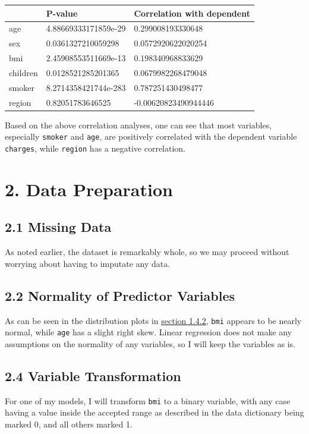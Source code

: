 \documentclass[]{article}
\begin{document}
\begin{longtable}[]{@{}lll@{}}
\toprule
& P-value & Correlation with dependent\tabularnewline
\midrule
\endhead
age & 4.88669333171859e-29 & 0.299008193330648\tabularnewline
sex & 0.0361327210059298 & 0.0572920622020254\tabularnewline
bmi & 2.45908553511669e-13 & 0.198340968833629\tabularnewline
children & 0.0128521285201365 & 0.0679982268479048\tabularnewline
smoker & 8.2714358421744e-283 & 0.787251430498477\tabularnewline
region & 0.82051783646525 & -0.00620823490944446\tabularnewline
\bottomrule
\end{longtable}

Based on the above correlation analyses, one can see that most
variables, especially \texttt{smoker} and \texttt{age}, are positively
correlated with the dependent variable \texttt{charges}, while
\texttt{region} has a negative correlation.

\section{2. Data Preparation}\label{data-preparation}

\subsection{2.1 Missing Data}\label{missing-data-1}

As noted earlier, the dataset is remarkably whole, so we may proceed
without worrying about having to imputate any data.

\subsection{2.2 Normality of Predictor
Variables}\label{normality-of-predictor-variables}

As can be seen in the distribution plots in
\protect\hyperlink{histogram}{section 1.4.2}, \texttt{bmi} appears to be
nearly normal, while \texttt{age} has a slight right skew. Linear
regression does not make any assumptions on the normality of any
variables, so I will keep the variables as is.

\hypertarget{variable-transformation}{\subsection{2.4 Variable
Transformation}\label{variable-transformation}}

For one of my models, I will transform \texttt{bmi} to a binary
variable, with any case having a value inside the accepted range as
described in the data dictionary being marked 0, and all others marked
1.
\end{document}
